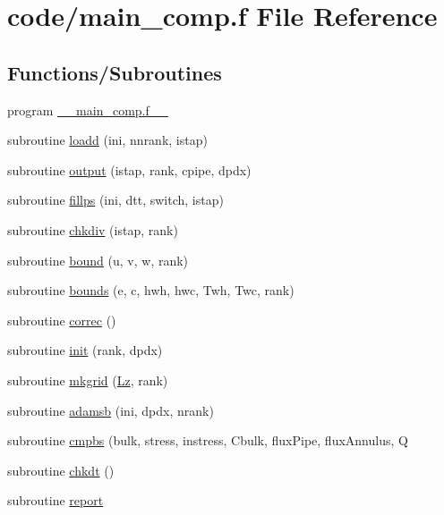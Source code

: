 \hypertarget{main__comp_8f}{}\section{code/main\+\_\+comp.f File Reference}
\label{main__comp_8f}
\subsection*{Functions/\+Subroutines}
\begin{DoxyCompactItemize}
\item 
program \hyperlink{main__comp_8f_a4643d5614804288ace9a9914cda6ed97}{\+\_\+\+\_\+main\+\_\+comp.\+f\+\_\+\+\_\+}
\item 
subroutine \hyperlink{main__comp_8f_a6cd0a5753b4396aa4aad63996c9e02fa}{loadd} (ini, nnrank, istap)
\item 
subroutine \hyperlink{main__comp_8f_a6731a0162dac08543396c05ee94ed2a0}{output} (istap, rank, cpipe, dpdx)
\item 
subroutine \hyperlink{main__comp_8f_a3ae77187a10bbcfa88368b904b5b878c}{fillps} (ini, dtt, switch, istap)
\item 
subroutine \hyperlink{main__comp_8f_a5440cdfb3b8587b1fb03ab3fc6d1c90a}{chkdiv} (istap, rank)
\item 
subroutine \hyperlink{main__comp_8f_a36c2d4d009a7600ece94a238769849ac}{bound} (u, v, w, rank)
\item 
subroutine \hyperlink{main__comp_8f_a6df9a9b6373074b5f5ef9ef372c765ee}{bounds} (e, c, hwh, hwc, Twh, Twc, rank)
\item 
subroutine \hyperlink{main__comp_8f_a0f42be68e90f5e66bc75121e7b8c4dbf}{correc} ()
\item 
subroutine \hyperlink{main__comp_8f_a20566218125a68c26ea2e3fd20198cf0}{init} (rank, dpdx)
\item 
subroutine \hyperlink{main__comp_8f_af036f82d2098294a0513a7ea9e34aae5}{mkgrid} (\hyperlink{param_8h_adc0ebcaf30ed63cf2fc257b6a879c715}{Lz}, rank)
\item 
subroutine \hyperlink{main__comp_8f_a8274773c9ed27c825e804bad6efeefd9}{adamsb} (ini, dpdx, nrank)
\item 
subroutine \hyperlink{main__comp_8f_afb307016d1f44258f2112f42b49501db}{cmpbs} (bulk, stress, instress, Cbulk, flux\+Pipe, flux\+Annulus, Q
\item 
subroutine \hyperlink{main__comp_8f_af09e0eab6b8b50ecfee67d75d1eb2e51}{chkdt} ()
\item 
subroutine \hyperlink{main__comp_8f_aa57d7f5bb62dee1fa46715ca0c57ec71}{report}

\end{DoxyCompactItemize}

